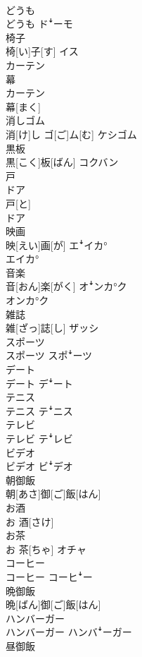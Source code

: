 \documentclass[8pt]{extreport}
\begin{document}
\begin{CJK}{UTF8}{min}
\\	どうも	
\\	どうも	ドꜜーモ
\\	椅子	
\\	椅[い]子[す]	イス
\\	カーテン 
\\	幕	
\\	カーテン 
\\	幕[まく]	
\\	消しゴム	
\\	消[け]し ゴ[ご]ム[む]	ケシゴム
\\	黒板	
\\	黒[こく]板[ばん]	コクバン
\\	戸 
\\	ドア	
\\	戸[と] 
\\	ドア	
\\	映画	
\\	映[えい]画[が]	エꜜイカ° 
\\	エイカ°
\\	音楽	
\\	音[おん]楽[がく]	オꜜンカ°ク 
\\	オンカ°ク
\\	雑誌	
\\	雑[ざっ]誌[し]	ザッシ
\\	スポーツ	
\\	スポーツ	スポꜜーツ
\\	デート	
\\	デート	デꜜート
\\	テニス	
\\	テニス	テꜜニス
\\	テレビ	
\\	テレビ	テꜜレビ
\\	ビデオ	
\\	ビデオ	ビꜜデオ
\\	朝御飯	
\\	朝[あさ]御[ご]飯[はん]	
\\	お酒	
\\	お 酒[さけ]	
\\	お茶	
\\	お 茶[ちゃ]	オチャ
\\	コーヒー	
\\	コーヒー	コーヒꜜー
\\	晩御飯	
\\	晩[ばん]御[ご]飯[はん]	
\\	ハンバーガー	
\\	ハンバーガー	ハンバꜜーガー
\\	昼御飯	

\end{CJK}
\end{document}
